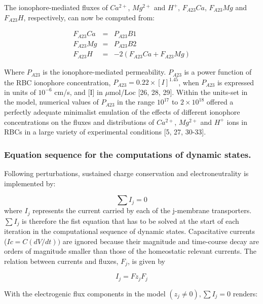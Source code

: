 \documentclass[a4paper]{article}
\newcommand{\F}[2]{F_{#1}#2}
\begin{document}
The ionophore-mediated fluxes of $Ca^{2+}$, $Mg^{2+}$ and $H^+$, $\F{A23}{Ca}$, $\F{A23}{Mg}$ and $\F{A23}{H}$, respectively, can now be computed from: 

\setcounter{equation}{0}
\renewcommand{\theequation}{A23-\arabic{equation}}

\begin{eqnarray}
\F{A23}{Ca} &=& P_{A23}B1 \\
\F{A23}{Mg} &=& P_{A23}B2 \\
\F{A23}{H} &=& -2(\F{A23}{Ca} + \F{A23}{Mg})
\end{eqnarray}

Where $P_{A23}$ is the ionophore-mediated permeability. $P_{A23}$ is a power function of the RBC ionophore concentration, $P_{A23} = 0.22\times [I]^{1.45}$, when $P_{A23}$ is expressed in units of $10^{-6}$ cm/s, and [I] in $\mu$mol/Loc [26, 28, 29]. Within the units-set in the model, numerical values of $P_{A23}$ in the range $10^{17}$ to $2\times10^{18}$ offered a perfectly adequate minimalist emulation of the effects of different ionophore concentrations on the fluxes and distributions of $Ca^{2+}$, $Mg^{2+}$ and $H^{+}$ ions in RBCs in a large variety of experimental conditions [5, 27, 30-33].    

\subsubsection{Equation sequence for the computations of dynamic states.}
Following perturbations, sustained charge conservation and electroneutrality is implemented by:

\setcounter{equation}{0}
\renewcommand{\theequation}{18\alph{equation}}

\begin{equation}
\sum I_j = 0 
\end{equation}
where $I_j$ represents the current carried by each of the j-membrane transporters. $\sum I_j$ is therefore the fist equation that has to be solved at the start of each iteration in the computational sequence of dynamic states. Capacitative currents ($Ic = C(dV/dt))$ are ignored because their magnitude and time-course decay are orders of magnitude smaller than those of the homeostatic relevant currents.  The relation between currents and fluxes, $F_j$, is given by 

\begin{equation}
I_j = F z_j F_j
\end{equation}

With the electrogenic flux components in the model $(z_j\neq 0), \sum I_j = 0$ renders:
\end{document}
